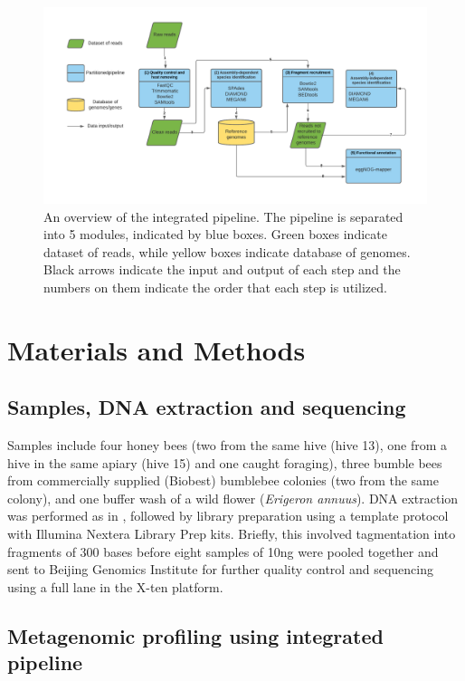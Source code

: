 \documentclass[11pt]{article}
\begin{document}
  \begin{figure}[H]
    \centering
    \includegraphics[width=\textwidth]{../Figures/FigurePipeline.pdf}
    \caption{An overview of the integrated pipeline. 
    The pipeline is separated into 5 modules, indicated by blue boxes. 
    Green boxes indicate dataset of reads, while yellow boxes indicate database of genomes. 
    Black arrows indicate the input and output of each step and the numbers on them indicate the order that each step is utilized.}
    \label{Pipeline}
  \end{figure}

  
  \section{Materials and Methods}
    \subsection{Samples, DNA extraction and sequencing}
    Samples include four honey bees (two from the same hive (hive 13), one from a hive in the same apiary (hive 15) and one caught foraging), three bumble bees from commercially supplied (Biobest) bumblebee colonies (two from the same colony), and one buffer wash of a wild flower (\textit{Erigeron annuus}).  
    \newline
    DNA extraction was performed as in \cite{graystock2020dominant}, followed by library preparation using a template protocol with Illumina Nextera Library Prep kits. Briefly, this involved tagmentation into fragments of 300 bases before eight samples of 10ng were pooled together and sent to Beijing Genomics Institute for further quality control and sequencing using a full lane in the X-ten platform. 

    \subsection{Metagenomic profiling using integrated pipeline}
\end{document}
